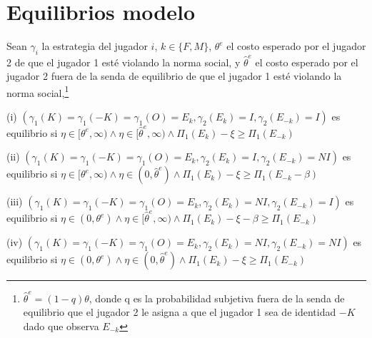 \section{Equilibrios modelo}

\begin{framed}
\noindent Sean $\gamma_i$ la estrategia del jugador $i$, $k \in \{F,M\}$,  $\theta^e$ el costo esperado por el jugador 2 de que el jugador 1 esté violando la norma social, y $\hat{\theta}^e$ el costo esperado por el jugador 2 fuera de la senda de equilibrio de que el jugador 1 esté violando la norma social,\footnote{$\hat{\theta}^e=(1-q)\theta$, donde q es la probabilidad subjetiva fuera de la senda de equilibrio que el jugador 2 le asigna a que el jugador 1 sea de identidad $-K$ dado que observa $E_{-k}$}

\noindent (i) $(\gamma_1(K)=\gamma_1(-K)=\gamma_1(O)=E_k, \gamma_2(E_k)=I, \gamma_2(E_{-k})=I)$ es equilibrio si $\eta\in[\theta^e, \infty) \wedge \eta\in[\hat{\theta}^e, \infty) \wedge \Pi_1(E_{k})- \xi \geq \Pi_1(E_{-k})$

\noindent (ii) $(\gamma_1(K)=\gamma_1(-K)=\gamma_1(O)=E_k, \gamma_2(E_k)=I, \gamma_2(E_{-k})=NI)$ es equilibrio si $\eta\in[\theta^e, \infty) \wedge \eta\in (0, \hat{\theta}^e) \wedge \Pi_1(E_{k})- \xi \geq \Pi_1(E_{-k}-\beta)$

\noindent (iii) $(\gamma_1(K)=\gamma_1(-K)=\gamma_1(O)=E_k, \gamma_2(E_k)=NI, \gamma_2(E_{-k})=I)$ es equilibrio si $\eta\in (0, \theta^e) \wedge \eta\in[\hat{\theta}^e, \infty) \wedge \Pi_1(E_{k})- \xi -\beta \geq \Pi_1(E_{-k})$

\noindent (iv) $(\gamma_1(K)=\gamma_1(-K)=\gamma_1(O)=E_k, \gamma_2(E_k)=NI, \gamma_2(E_{-k})=NI)$ es equilibrio si $\eta\in (0, \theta^e) \wedge \eta\in(0, \hat{\theta}^e) \wedge \Pi_1(E_{k})- \xi \geq \Pi_1(E_{-k})$
\end{framed}

